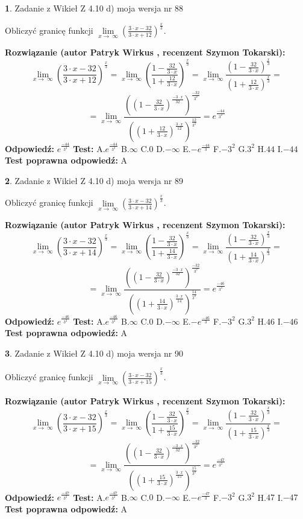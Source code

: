 \documentclass[12pt, a4paper]{article}
\theoremstyle{definition} %
\newtheorem{zad}{}
\newcommand{\zadStart}[1]{\begin{zad}#1\newline}
\newcommand{\zadStop}{\end{zad}}
\newcommand{\rozwStart}[2]{\noindent \textbf{Rozwiązanie (autor #1 , recenzent #2): }\newline}
\newcommand{\rozwStop}{\newline}
\newcommand{\odpStart}{\noindent \textbf{Odpowiedź:}\newline}
\newcommand{\odpStop}{\newline}
\newcommand{\testStart}{\noindent \textbf{Test:}\newline}
\newcommand{\testStop}{\newline}
\newcommand{\kluczStart}{\noindent \textbf{Test poprawna odpowiedź:}\newline}
\newcommand{\kluczStop}{\newline}
\begin{document}
\zadStart{Zadanie z Wikieł Z 4.10 d) moja wersja nr 88}


Obliczyć granicę funkcji  $\lim\limits_{x\to\ \infty}(\frac{3\cdot x-32}{3\cdot x+12})^{\frac{x}{3}}$.
\zadStop
\rozwStart{Patryk Wirkus}{Szymon Tokarski}
$$\lim\limits_{x\to\ \infty}(\frac{3\cdot x-32}{3\cdot x+12})^{\frac{x}{3}} = \lim\limits_{x\to\ \infty}(\frac{1-\frac{32}{3\cdot x}}{1+\frac{12}{3\cdot x}})^{\frac{x}{3}}=\lim\limits_{x\to\ \infty}\frac{(1-\frac{32}{3\cdot x})^{\frac{x}{3}}}{(1+\frac{12}{3\cdot x})^{\frac{x}{3}}}=$$
$$=\lim\limits_{x\to\ \infty}\frac{((1-\frac{32}{3\cdot x})^{\frac{-3\cdot x}{32}})^{\frac{-32}{3^{2}}}}{((1+\frac{12}{3\cdot x})^{\frac{3\cdot x}{12}})^{\frac{12}{3^{2}}}}=e^{\frac{-44}{3^{2}}}$$
\rozwStop
\odpStart
$e^{\frac{-44}{3^{2}}}$
\odpStop
\testStart
A.$e^{\frac{-44}{3^{2}}}$ B.$\infty$ C.$0$ D.$-\infty$ E.$-e^{\frac{-44}{3}}$
F.$-3^{2}$ G.$3^{2}$
H.$44$
I.$-44$
\testStop
\kluczStart
A
\kluczStop



\zadStart{Zadanie z Wikieł Z 4.10 d) moja wersja nr 89}


Obliczyć granicę funkcji  $\lim\limits_{x\to\ \infty}(\frac{3\cdot x-32}{3\cdot x+14})^{\frac{x}{3}}$.
\zadStop
\rozwStart{Patryk Wirkus}{Szymon Tokarski}
$$\lim\limits_{x\to\ \infty}(\frac{3\cdot x-32}{3\cdot x+14})^{\frac{x}{3}} = \lim\limits_{x\to\ \infty}(\frac{1-\frac{32}{3\cdot x}}{1+\frac{14}{3\cdot x}})^{\frac{x}{3}}=\lim\limits_{x\to\ \infty}\frac{(1-\frac{32}{3\cdot x})^{\frac{x}{3}}}{(1+\frac{14}{3\cdot x})^{\frac{x}{3}}}=$$
$$=\lim\limits_{x\to\ \infty}\frac{((1-\frac{32}{3\cdot x})^{\frac{-3\cdot x}{32}})^{\frac{-32}{3^{2}}}}{((1+\frac{14}{3\cdot x})^{\frac{3\cdot x}{14}})^{\frac{14}{3^{2}}}}=e^{\frac{-46}{3^{2}}}$$
\rozwStop
\odpStart
$e^{\frac{-46}{3^{2}}}$
\odpStop
\testStart
A.$e^{\frac{-46}{3^{2}}}$ B.$\infty$ C.$0$ D.$-\infty$ E.$-e^{\frac{-46}{3}}$
F.$-3^{2}$ G.$3^{2}$
H.$46$
I.$-46$
\testStop
\kluczStart
A
\kluczStop



\zadStart{Zadanie z Wikieł Z 4.10 d) moja wersja nr 90}


Obliczyć granicę funkcji  $\lim\limits_{x\to\ \infty}(\frac{3\cdot x-32}{3\cdot x+15})^{\frac{x}{3}}$.
\zadStop
\rozwStart{Patryk Wirkus}{Szymon Tokarski}
$$\lim\limits_{x\to\ \infty}(\frac{3\cdot x-32}{3\cdot x+15})^{\frac{x}{3}} = \lim\limits_{x\to\ \infty}(\frac{1-\frac{32}{3\cdot x}}{1+\frac{15}{3\cdot x}})^{\frac{x}{3}}=\lim\limits_{x\to\ \infty}\frac{(1-\frac{32}{3\cdot x})^{\frac{x}{3}}}{(1+\frac{15}{3\cdot x})^{\frac{x}{3}}}=$$
$$=\lim\limits_{x\to\ \infty}\frac{((1-\frac{32}{3\cdot x})^{\frac{-3\cdot x}{32}})^{\frac{-32}{3^{2}}}}{((1+\frac{15}{3\cdot x})^{\frac{3\cdot x}{15}})^{\frac{15}{3^{2}}}}=e^{\frac{-47}{3^{2}}}$$
\rozwStop
\odpStart
$e^{\frac{-47}{3^{2}}}$
\odpStop
\testStart
A.$e^{\frac{-47}{3^{2}}}$ B.$\infty$ C.$0$ D.$-\infty$ E.$-e^{\frac{-47}{3}}$
F.$-3^{2}$ G.$3^{2}$
H.$47$
I.$-47$
\testStop
\kluczStart
A
\kluczStop
\end{document}
